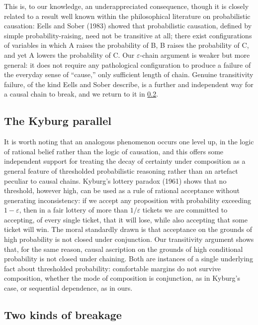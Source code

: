 \documentclass[11pt]{article}
\theoremstyle{definition}
\newcommand{\eps}{\varepsilon}
\begin{document}
This is, to our knowledge, an underappreciated consequence, though it is closely related to a result well known within the philosophical literature on probabilistic causation: Eells and Sober (1983) showed that probabilistic causation, defined by simple probability-raising, need not be transitive at all; there exist configurations of variables in which A raises the probability of B, B raises the probability of C, and yet A lowers the probability of C. Our $\eps$-chain argument is weaker but more general: it does not require any pathological configuration to produce a failure of the everyday sense of ``cause,'' only sufficient length of chain. Genuine transitivity failure, of the kind Eells and Sober describe, is a further and independent way for a causal chain to break, and we return to it in \cref{subsec:breakage}.

\subsection{The Kyburg parallel}

It is worth noting that an analogous phenomenon occurs one level up, in the logic of rational belief rather than the logic of causation, and this offers some independent support for treating the decay of certainty under composition as a general feature of thresholded probabilistic reasoning rather than an artefact peculiar to causal chains. Kyburg's lottery paradox (1961) shows that no threshold, however high, can be used as a rule of rational acceptance without generating inconsistency: if we accept any proposition with probability exceeding $1-\eps$, then in a fair lottery of more than $1/\eps$ tickets we are committed to accepting, of every single ticket, that it will lose, while also accepting that some ticket will win. The moral standardly drawn is that acceptance on the grounds of high probability is not closed under conjunction. Our transitivity argument shows that, for the same reason, causal ascription on the grounds of high conditional probability is not closed under chaining. Both are instances of a single underlying fact about thresholded probability: comfortable margins do not survive composition, whether the mode of composition is conjunction, as in Kyburg's case, or sequential dependence, as in ours.

\subsection{Two kinds of breakage}
\label{subsec:breakage}
\end{document}
